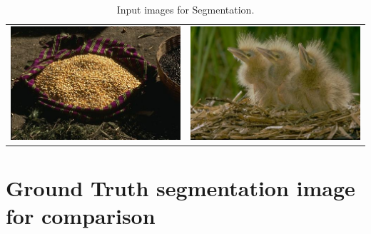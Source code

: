 \documentclass{article}
\begin{document}
\begin{center}
\begin{table}
\begin{tabular}{c| c}
\includegraphics[scale = 0.3]{image3} & \includegraphics[scale = 0.3]{image4}\\
\end{tabular}
\caption{Input images for Segmentation.}
\label{table:1}
\end{table}
\end{center}


\section{Ground Truth segmentation image for comparison}
\end{document}
